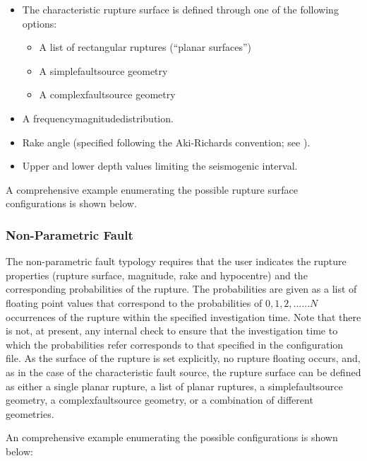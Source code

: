\begin{itemize}

    \item The characteristic rupture surface is defined through one of the
    following options:

        \begin{itemize}

            \item A list of rectangular ruptures (``planar surfaces'')

            \item A \gls{simplefaultsource} geometry

            \item A \gls{complexfaultsource} geometry

        \end{itemize}

    \item A \gls{frequencymagnitudedistribution}.

    \item Rake angle (specified following the Aki-Richards convention; see
          \citet{aki2002}).

    \item Upper and lower depth values limiting the seismogenic interval.

\end{itemize}
A comprehensive example enumerating the possible rupture surface configurations is shown below. 



\subsubsection{Non-Parametric Fault}
\label{desc_nonparametric_fault}

The non-parametric fault typology requires that the user indicates the rupture properties (rupture surface, magnitude, rake and hypocentre) and the corresponding probabilities of the rupture. The probabilities are given as a list of floating point values that correspond to the probabilities of $0, 1, 2, \ldots ... N$ occurrences of the rupture within the specified investigation time. Note that there is not, at present, any internal check to ensure that the investigation time to which the probabilities refer corresponds to that specified in the configuration file. As the surface of the rupture is set explicitly, no rupture floating occurs, and, as in the case of the characteristic fault source, the rupture surface can be defined as either a single planar rupture, a list of planar ruptures, a \gls{simplefaultsource} geometry, a \gls{complexfaultsource} geometry, or a combination of different geometries.

An comprehensive example enumerating the possible configurations is shown below:



